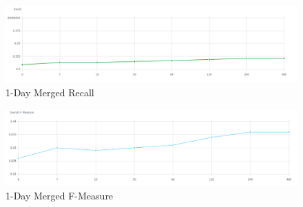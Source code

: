 \documentclass[a4paper,portrait,12pt]{article}
\begin{document}
\begin{figure}[H]
	\centering
	\includegraphics[width=\linewidth]{images/7days-merged-recall.png}
	\caption{1-Day Merged Recall}
	\label{fig:7days-merged-recall}
\end{figure}

\begin{figure}[H]
	\centering
	\includegraphics[width=\linewidth]{images/7days-merged-f-measure.png}
	\caption{1-Day Merged F-Measure}
	\label{fig:7days-merged-f-measure}
\end{figure}
\end{document}
